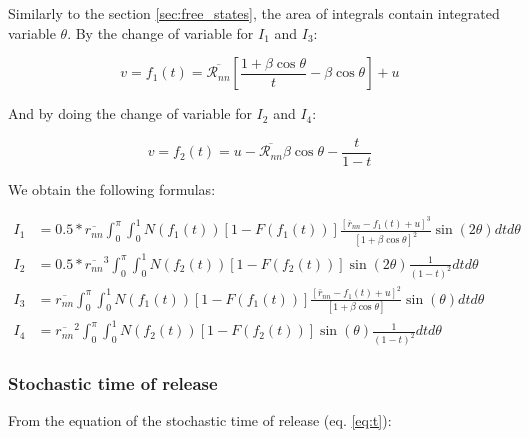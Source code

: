 Similarly to the section \ref{sec:free_states}, the area of integrals contain integrated variable $\theta$. By the change of variable for $I_1$ and $I_3$:

\begin{equation}
    v = f_1(t) = \overline{\mathscr{R}_{n n}}\left[\frac{1+\beta \cos \theta}{t}-\beta \cos \theta\right]+u
    \label{eq:2_5}
\end{equation}

And by doing the change of variable for $I_2$ and $I_4$:

\begin{equation}
    v = f_2(t) = u-\overline{\mathscr{R}_{n n}} \beta \cos \theta-\frac{t}{1-t}
    \label{eq:2_6}
\end{equation}

We obtain the following formulas:

\begin{equation}
    \begin{aligned}
    I_{1}&=0.5 * \overline{{r}_{n n}} \int_{0}^{\pi} \int_{0}^{1} N\left(f_1\left(t\right)\right)\left[1-F\left(f_1\left(t\right)\right)\right] \frac{\left[\overline{r}_{n n}-f_1\left(t\right)+u\right]^{3}}{[1+\beta \cos \theta]^{2}} \sin (2 \theta) d t d \theta \\
    I_{2}&=0.5 * \overline{r_{n n}}^{3} \int_{0}^{\pi} \int_{0}^{1} N\left(f_2\left(t\right)\right)\left[1-F\left(f_2\left(t\right)\right)\right] \sin (2 \theta) \frac{1}{\left(1-t\right)^{2}} d t d \theta \\
    I_{3}&=\overline{r_{n n}} \int_{0}^{\pi} \int_{0}^{1} N\left(f_1\left(t\right)\right)\left[1-F\left(f_1\left(t\right)\right)\right] \frac{\left[\bar{r}_{n n}-f_1\left(t\right)+u\right]^{2}}{[1+\beta \cos \theta]} \sin (\theta) d t d \theta \\
    I_{4}&=\overline{r_{n n}}^{2} \int_{0}^{\pi} \int_{0}^{1} N\left(f_2\left(t\right)\right)\left[1-F\left(f_2\left(t\right)\right)\right] \sin (\theta) \frac{1}{\left(1-t\right)^{2}} d t d \theta
    \end{aligned}
    \label{eq:2_7}
\end{equation}

\subsubsection{Stochastic time of release}

From the equation of the stochastic time of release (eq. \ref{eq:t}):

